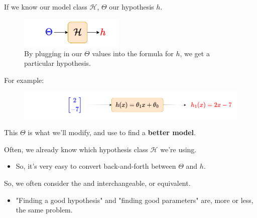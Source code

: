 
        If we know our model class $\mathcal{H}$, $\Theta$  our hypothesis $h$.

        \begin{figure}[H]
        \centering
            \includegraphics[width=50mm,scale=0.5]{images/regression_images/hypothesis_class.png}
        
            \caption*{By plugging in our $\Theta$ values into the formula for $h$, we get a particular hypothesis.}
        \end{figure}

        For example:

        \begin{figure}[H]
        \centering
            \includegraphics[width=150mm,scale=0.5]{images/regression_images/hypothesis_class_ex.png}
    
        \end{figure}

        This $\Theta$ is what we'll modify, and use to find a \textbf{better model}.\\
        
        \begin{concept}
            Often, we already know which hypothesis class $\mathcal{H}$ we're using.

            \begin{itemize}
                \item So, it's very easy to convert back-and-forth between $\Theta$ and $h$.
            \end{itemize}

            So, we often consider the  and  interchangeable, or equivalent.

            \begin{itemize}
                \item "Finding a good hypothesis" and "finding good parameters" are, more or less, the same problem.
            \end{itemize}
        \end{concept}

